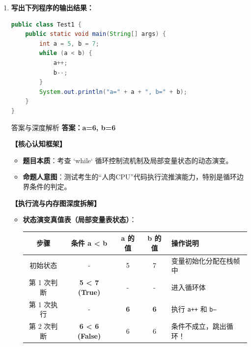 \documentclass[12pt, a4paper]{ctexart}
\begin{document}
\begin{enumerate}[label=\textbf{\arabic*.}]
	\item \textbf{写出下列程序的输出结果：}
	      \begin{lstlisting}[language=Java]
public class Test1 {
    public static void main(String[] args) {
        int a = 5, b = 7;
        while (a < b) {
            a++;
            b--;
        }
        System.out.println("a=" + a + ", b=" + b);
    }
}
          \end{lstlisting}

	      \begin{bluebox}{答案与深度解析}
		      \textbf{答案：a=6, b=6}

		      \textbf{【核心认知框架】}
		      \begin{itemize}[leftmargin=*, nosep]
			      \item \textbf{题目本质}：考查 `while` 循环控制流机制及局部变量状态的动态演变。
			      \item \textbf{命题人意图}：测试考生的“人肉CPU”代码执行流推演能力，特别是循环边界条件的判定。
		      \end{itemize}

		      \textbf{【执行流与内存图深度拆解】}
		      \begin{itemize}[leftmargin=*, nosep]

			      \item \textbf{状态演变真值表（局部变量表状态）}：
			            \begin{tabular}{|c|c|c|c|l|}
				            \hline
				            \textbf{步骤} & \textbf{条件 a < b}      & \textbf{a 的值} & \textbf{b 的值} & \textbf{操作说明}                  \\
				            \hline
				            初始状态        & -                      & 5             & 7             & 变量初始化分配在栈帧中                    \\
				            \hline
				            第 1 次判断     & \textbf{5 < 7 (True)}  & -             & -             & 进入循环体                          \\
				            \hline
				            第 1 次执行     & -                      & \textbf{6}    & \textbf{6}    & 执行 \texttt{a++} 和 \texttt{b--} \\
				            \hline
				            第 2 次判断     & \textbf{6 < 6 (False)} & 6             & 6             & \color{red}条件不成立，跳出循环！         \\
				            \hline
			            \end{tabular}


\end{itemize}
\end{bluebox}
\end{enumerate}
\end{document}
